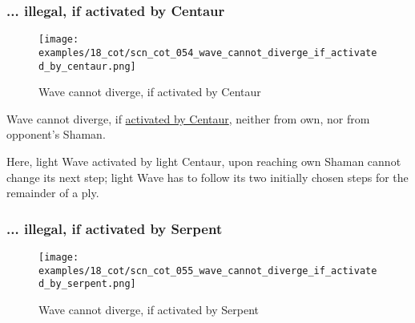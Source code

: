 \clearpage %

\subsubsection*{... illegal, if activated by Centaur}
\label{sec:Conquest of Tlalocan/Divergence/... illegal, if activated by Centaur}

\vspace*{-1.4\baselineskip}
\noindent
\begin{figure}[!h]
\texttt{[image: examples/18\_cot/scn\_cot\_054\_wave\_cannot\_diverge\_if\_activated\_by\_centaur.png]}
\vspace*{-1.3\baselineskip}
\caption{Wave cannot diverge, if activated by Centaur}
\label{fig:scn_cot_054_wave_cannot_diverge_if_activated_by_centaur}
\end{figure}

\vspace*{-0.5\baselineskip}
Wave cannot diverge, if
\hyperref[fig:scn_hd_07_wave_activation_by_centaur_first_step]{activated by Centaur},
neither from own, nor from opponent's Shaman.

Here, light Wave activated by light Centaur, upon reaching own Shaman cannot change
its next step; light Wave has to follow its two initially chosen steps for the
remainder of a ply.

\clearpage %

\subsubsection*{... illegal, if activated by Serpent}
\label{sec:Conquest of Tlalocan/Divergence/... illegal, if activated by Serpent}

\vspace*{-1.4\baselineskip}
\noindent
\begin{figure}[!h]
\texttt{[image: examples/18\_cot/scn\_cot\_055\_wave\_cannot\_diverge\_if\_activated\_by\_serpent.png]}
\vspace*{-1.3\baselineskip}
\caption{Wave cannot diverge, if activated by Serpent}
\label{fig:scn_cot_055_wave_cannot_diverge_if_activated_by_serpent}
\end{figure}

